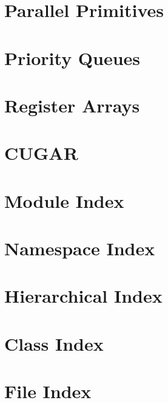 \documentclass[twoside]{book}
\newcommand{\+}{\discretionary{\mbox{\scriptsize$\hookleftarrow$}}{}{}}
\begin{document}
\chapter{Parallel Primitives}
\label{cuda_primitives_page}

\chapter{Priority Queues}
\label{priority_queues_page}

\chapter{Register Arrays}
\label{register_array_page}

\chapter{C\+U\+G\+AR}
\label{cugar_page}

\chapter{Module Index}

\chapter{Namespace Index}

\chapter{Hierarchical Index}

\chapter{Class Index}

\chapter{File Index}

\end{document}
